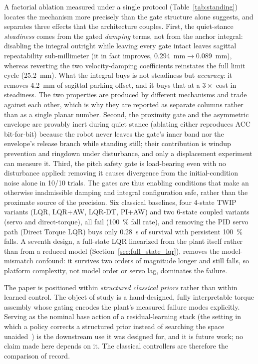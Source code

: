 \documentclass[a4paper,fleqn]{cas-dc}
\begin{document}
A factorial ablation measured under a single protocol (Table~\ref{tab:standing}) locates the mechanism more precisely than the gate structure alone suggests, and separates three effects that the architecture couples. First, the quiet-stance \emph{steadiness} comes from the gated \emph{damping} terms, not from the anchor integral: disabling the integral outright while leaving every gate intact leaves sagittal repeatability sub-millimeter (it in fact improves, \SI{0.294}{mm}$\rightarrow$\SI{0.089}{mm}), whereas reverting the two velocity-damping coefficients reinstates the full limit cycle (\SI{25.2}{mm}). What the integral buys is not steadiness but \emph{accuracy}: it removes \SI{4.2}{mm} of sagittal parking offset, and it buys that at a $3{\times}$ cost in steadiness. The two properties are produced by different mechanisms and trade against each other, which is why they are reported as separate columns rather than as a single planar number. Second, the proximity gate and the asymmetric envelope are provably inert during quiet stance (ablating either reproduces ACC bit-for-bit) because the robot never leaves the gate's inner band nor the envelope's release branch while standing still; their contribution is windup prevention and ringdown under disturbance, and only a displacement experiment can measure it. Third, the pitch safety gate is load-bearing even with no disturbance applied: removing it causes divergence from the initial-condition noise alone in \num{10}/\num{10} trials. The gates are thus enabling conditions that make an otherwise inadmissible damping and integral configuration safe, rather than the proximate source of the precision.
Six classical baselines, four 4-state TWIP variants (LQR, LQR+AW, LQR-DT, PI+AW) and two 6-state coupled variants (servo and direct-torque), all fail (\SI{100}{\percent} fall rate), and removing the PID servo path (Direct Torque LQR) buys only \SI{0.28}{s} of survival with persistent \SI{100}{\percent} falls. A seventh design, a full-state LQR linearized from the plant itself rather than from a reduced model (Section~\ref{sec:full_state_lqr}), removes the model-mismatch confound: it survives two orders of magnitude longer and still falls, so platform complexity, not model order or servo lag, dominates the failure.

The paper is positioned within \emph{structured classical priors} rather than within learned control. The object of study is a hand-designed, fully interpretable torque assembly whose gating encodes the plant's measured failure modes explicitly. Serving as the nominal base action of a residual-learning stack (the setting in which a policy corrects a structured prior instead of searching the space unaided~\cite{johannink2019residual,silver2018residual}) is the downstream use it was designed for, and it is future work; no claim made here depends on it. The classical controllers are therefore the comparison of record.
\end{document}
